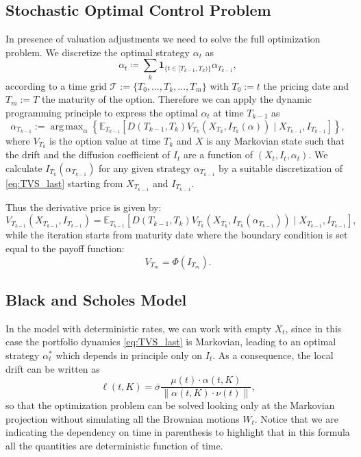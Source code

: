 \documentclass[11pt]{article}
\DeclareMathOperator*{\argmax}{arg\,max}
\begin{document}
\subsection{Stochastic Optimal Control Problem}
In presence of valuation adjustments we need to solve the full optimization problem. We discretize the optimal strategy $\alpha_t$ as
\begin{equation}
    \alpha_t \coloneqq \sum_k \mathbf{1}_{ \{t \in [T_{k-1}, T_k)\}}\alpha_{T_{k-1}},
\label{eq:piecewise_strategy}\end{equation}
according to a time grid $\mathcal{T}:=\{T_0,...,T_k,...,T_m\}$ with $T_0:=t$ the pricing date and $T_m :=T$ the maturity of the option. 
Therefore we can apply the dynamic programming principle to express the optimal $\alpha_t$ at time $T_{k-1}$ as
\begin{equation}
    \alpha_{T_{k-1}}:=\argmax_{\alpha} \left\{\mathbb{E}_{T_{k-1}}\left[D\left(T_{k-1},T_{k} \right) V_{T_{k}}\left(X_{T_{k}}, I_{T_{k}}(\alpha)\right) \mid X_{T_{k-1}}, I_{T_{k-1}}\right]\right\},
\label{eq:recursion}\end{equation}
where $V_{T_k}$ is the option value at time $T_k$ and $X$ is any Markovian state such that the drift and the diffusion coefficient of $I_t$ are a function of $\left(X_t,I_t,\alpha_t\right)$. We calculate $I_{T_k}\left(\alpha_{T_{k-1}}\right)$ for any given strategy $\alpha_{T_{k-1}}$ by a suitable discretization of \eqref{eq:TVS_last} starting from $X_{T_{k-1}}$ and $I_{T_{k-1}}$.

Thus the derivative price is given by:
\begin{equation}
    V_{T_{k-1}}\left(X_{T_{k-1}}, I_{T_{k-1}}\right)=\mathbb{E}_{T_{k-1}}\left[D\left(T_{k-1},T_{k}\right) V_{T_{k}}\left(X_{T_{k}}, I_{T_{k}}\left(\alpha_{T_{k-1}}\right)\right) \mid X_{T_{k-1}}, I_{T_{k-1}}\right],
\label{eq:recursion2}\end{equation}
while the iteration starts from maturity date where the boundary condition is set equal to the payoff function:
\begin{equation}
    V_{T_m} = \Phi\left(I_{T_m}\right).
\end{equation}

\subsection{Black and Scholes Model}
In the \textcite{BlackScholes} model with deterministic rates, we can work with empty $X_t$, since in this case the portfolio dynamics \eqref{eq:TVS_last} is Markovian, leading to an optimal strategy $\alpha_t^*$ which depends in principle only on $I_t$. As a consequence, the local drift can be written as
\begin{equation}
     \ell \left(t,K\right) = \bar{\sigma}   \frac{\mu\left(t\right) \cdot \alpha\left(t,K\right)}{\|\alpha\left(t,K\right) \cdot \nu\left(t\right)\|},  
\end{equation}
so that the optimization problem can be solved looking only at the Markovian projection without simulating all the Brownian motions $W_t$. Notice that we are indicating the dependency on time in parenthesis to highlight that in this formula all the quantities are deterministic function of time.
\end{document}
